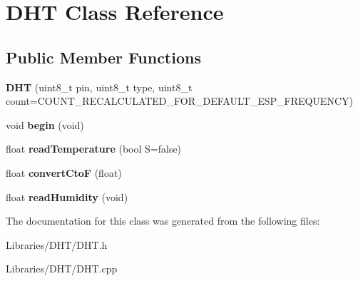 \hypertarget{class_d_h_t}{}\section{D\+H\+T Class Reference}
\label{class_d_h_t}
\subsection*{Public Member Functions}
\begin{DoxyCompactItemize}
\item 
\hypertarget{class_d_h_t_ab1c7a78d57ca914a0603c10518d834e6}{}{\bfseries D\+H\+T} (uint8\+\_\+t pin, uint8\+\_\+t type, uint8\+\_\+t count=C\+O\+U\+N\+T\+\_\+\+R\+E\+C\+A\+L\+C\+U\+L\+A\+T\+E\+D\+\_\+\+F\+O\+R\+\_\+\+D\+E\+F\+A\+U\+L\+T\+\_\+\+E\+S\+P\+\_\+\+F\+R\+E\+Q\+U\+E\+N\+C\+Y)\label{class_d_h_t_ab1c7a78d57ca914a0603c10518d834e6}

\item 
\hypertarget{class_d_h_t_a757dc4b34611c08168248b276e4f84a8}{}void {\bfseries begin} (void)\label{class_d_h_t_a757dc4b34611c08168248b276e4f84a8}

\item 
\hypertarget{class_d_h_t_a221e8b5b7b2147be0cdd16f2b6344a26}{}float {\bfseries read\+Temperature} (bool S=false)\label{class_d_h_t_a221e8b5b7b2147be0cdd16f2b6344a26}

\item 
\hypertarget{class_d_h_t_a582df4d39cd56b4acbd47fbe75aedcc3}{}float {\bfseries convert\+Cto\+F} (float)\label{class_d_h_t_a582df4d39cd56b4acbd47fbe75aedcc3}

\item 
\hypertarget{class_d_h_t_a23bfb1643c202289efcf8f5a86717a9c}{}float {\bfseries read\+Humidity} (void)\label{class_d_h_t_a23bfb1643c202289efcf8f5a86717a9c}

\end{DoxyCompactItemize}


The documentation for this class was generated from the following files\+:\begin{DoxyCompactItemize}
\item 
Libraries/\+D\+H\+T/D\+H\+T.\+h\item 
Libraries/\+D\+H\+T/D\+H\+T.\+cpp\end{DoxyCompactItemize}
